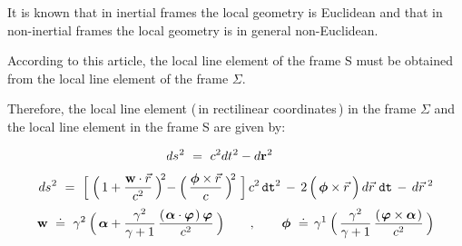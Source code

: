 \documentclass[10pt,fleqn]{article}
\begin{document}
\newpage

\par {}

\bigskip \smallskip

\noindent It is known that in inertial frames the local geometry is Euclidean and that in non-inertial frames the local geometry is in general non-Euclidean.
\par \medskip \smallskip
\noindent According to this article, the local line element of the frame S must be obtained from the local line element of the frame $\Sigma$.
\par \medskip \smallskip
\noindent Therefore, the local line element (\,in rectilinear coordinates\,) in the frame $\Sigma$ and the local line element in the frame S are given by:
\par \vspace{-0.06em}
\begin{eqnarray*}
\hspace{-2.50em} ds^{\hspace{+0.03em}2} ~=~ c^2 dt^{\hspace{+0.03em}2} - d\mathbf{r}^{\hspace{+0.03em}2}
\end{eqnarray*}
\vspace{-0.45em}
\begin{eqnarray*}
ds^{\hspace{+0.03em}2} ~=~ \Big [ \; \Big ( \, 1 + \frac{{\mathbf w} \cdot \vec{r}}{c^2} \: \Big )^{\hspace{-0.18em}2} \hspace{-0.21em}- \Big ( \, \frac{\boldsymbol{\phi} \times \vec{r}}{c} \: \Big )^{\hspace{-0.18em}2} \,\, \Big ] \, c^2 \, \mathtt{dt}^2 \,-\, 2 \, \Big ( \, \boldsymbol{\phi} \times \vec{r} \: \Big ) \, d\vec{r} \,\, \mathtt{dt} \,-\, d\vec{r}^{\hspace{+0.24em}2}
\end{eqnarray*}
\vspace{+0.06em}
\begin{eqnarray*}
\hspace{+0.03em} {\mathbf w} ~\doteq~ \gamma^2 \: \Big ( \, \boldsymbol{\alpha} + \frac{\gamma^2}{\gamma + 1} \, \frac{(\hspace{+0.09em} \boldsymbol{\alpha} \cdot \boldsymbol{\varphi} \hspace{+0.09em}) \: \boldsymbol{\varphi}}{c^2} \: \Big ) \hspace{+2.04em} , \hspace{+2.04em} \boldsymbol{\phi} ~\doteq\, \gamma^1 \: \Big ( \, \frac{\gamma^2}{\gamma + 1} \, \frac{(\hspace{+0.09em} \boldsymbol{\varphi} \times \boldsymbol{\alpha} \hspace{+0.09em})}{c^2} \: \Big )
\end{eqnarray*}
\end{document}
